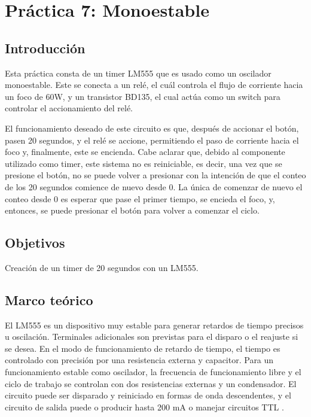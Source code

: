 \clearpage

\section{Práctica 7: Monoestable}

\subsection{Introducción}

Esta práctica consta de un timer LM555 que es usado como un oscilador monoestable. Este se conecta a un relé, el cuál controla el flujo de corriente hacia un foco de 60W, y un transistor BD135, el cual actúa como un switch para controlar el accionamiento del relé.

El funcionamiento deseado de este circuito es que, después de accionar el botón, pasen 20 segundos, y el relé se accione, permitiendo el paso de corriente hacia el foco y, finalmente, este se encienda. Cabe aclarar que, debido al componente utilizado como timer, este sistema no es reiniciable, es decir, una vez que se presione el botón, no se puede volver a presionar con la intención de que el conteo de los 20 segundos comience de nuevo desde 0. La única de comenzar de nuevo el conteo desde 0 es esperar que pase el primer tiempo, se encieda el foco, y, entonces, se puede presionar el botón para volver a comenzar el ciclo.

\subsection{Objetivos}

Creación de un timer de 20 segundos con un LM555.

\subsection{Marco teórico}

El LM555 es un dispositivo muy estable para generar retardos de tiempo precisos u oscilación. Terminales adicionales son previstas para el disparo o el reajuste si se desea. En el modo de funcionamiento de retardo de tiempo, el tiempo es controlado con precisión por una resistencia externa y capacitor. Para un funcionamiento estable como oscilador, la frecuencia de funcionamiento libre y el ciclo de trabajo se controlan con dos resistencias externas y un condensador. El circuito puede ser disparado y reiniciado en formas de onda descendentes, y el circuito de salida puede o producir hasta 200 mA o manejar circuitos TTL \parencite{texas_instruments_lm555_2015}.

